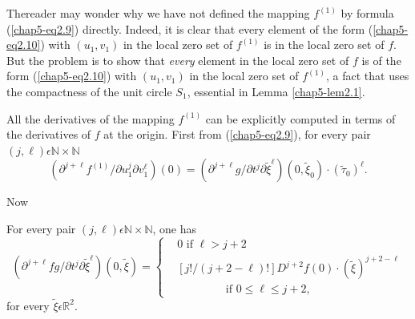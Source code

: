 \begin{remark}\label{chap5-rem2.2}
The\pageoriginale reader may wonder why we have not defined the mapping
$f^{(1)}$ by formula (\ref{chap5-eq2.9}) directly. Indeed, it is clear
that every element of the form (\ref{chap5-eq2.10}) with $(u_{1},
v_{1})$ in the local zero set of $f^{(1)}$ is in the local zero set of
$f$. But the problem is to show that {\em every} element in the local
zero set of $f$ is of the form (\ref{chap5-eq2.10}) with $(u_{1},
v_{1})$ in the local zero set of $f^{(1)}$, a fact that uses the
compactness of the unit circle $S_{1}$, essential in Lemma \ref{chap5-lem2.1}.
\end{remark}

All the derivatives of the mapping $f^{(1)}$ can be explicitly
computed in terms of the derivatives of $f$ at the origin. First from
(\ref{chap5-eq2.9}), for every pair $(j, \ell) \epsilon \mathbb{N}
\times \mathbb{N}$
$$
(\partial^{j+\ell} f^{(1)} / \partial u_{1}^{j}\partial
v_{1}^{\ell})(0) = (\partial^{j+\ell} g/\partial t^{j}\partial
\widetilde{\xi}^{\ell}) (0, \widetilde{\xi}_{0}) \cdot (\widetilde{\tau}_{0})^{\ell}.
$$

Now
\begin{lemma}\label{chap5-lem2.2}
For every pair $(j, \ell) \epsilon \mathbb{N} \times \mathbb{N}$, one
has
\begin{equation*}
(\partial^{j+\ell}  fg / \partial t^{j}\partial \widetilde{\xi}^{\ell})
  (0, \widetilde{\xi}) = 
\begin{cases}
& 0 \text{ if } \ell > j+2\\
& [j! / (j + 2 - \ell)!] D^{j+2} f(0) \cdot
  (\widetilde{\xi})^{j+2-\ell}\\
&\qquad\qquad \text{ if } 0 \leq \ell \leq j + 2,
\end{cases}\tag{2.11}\label{chap5-eq2.11}
\end{equation*}
for every $\widetilde{\xi} \epsilon \mathbb{R}^{2}$.
\end{lemma}

